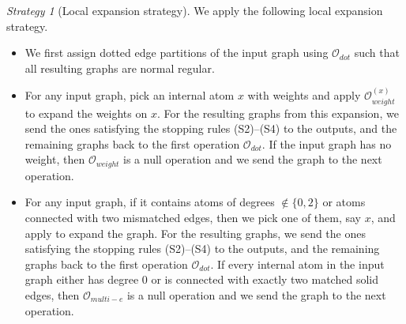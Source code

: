 \documentclass{article}
\newcommand{\1}{\mathds{1}}
\numberwithin{equation}{section}
\renewcommand{\cal}{\mathcal}
\theoremstyle{plain} %
\theoremstyle{remark}
\newtheorem{strategy}[theorem]{Strategy}
\begin{document}
\begin{strategy}[Local expansion strategy]\label{strat_local}
We apply the following local expansion strategy.
\begin{itemize}
\item[(1)] We first assign dotted edge partitions of the input graph using $\cal O_{dot}$ such that all resulting graphs are normal regular. %


\item[(2)] For any input graph, pick an internal atom $x$ with weights and apply ${\cal O}_{weight}^{(x)}$ to expand  the weights on $x$. For the resulting graphs from this expansion, we send the ones satisfying the stopping rules (S2)--(S4) to the outputs, and the remaining graphs back to the first operation $\cal O_{dot}$. If the input graph has no weight, then  ${\cal O}_{weight}$ is a null operation and we send the graph to the next operation.   

\item[(3)]  For any input graph, if it contains atoms of degrees $\notin \{0,2\}$ or atoms connected with two mismatched edges, then we pick one of them, say $x$, and apply \smash{$\cal O_{multi-e}^{(x)}$} to expand the graph. For the resulting graphs, we send the ones satisfying the stopping rules (S2)--(S4) to the outputs, and the remaining graphs back to the first operation $\cal O_{dot}$. If every internal atom in the input graph either has degree 0 or is connected with exactly two matched solid edges, then $\cal O_{multi-e}$ is a null operation and we send the graph to the next operation.  


\end{itemize}
\end{strategy}
\end{document}
